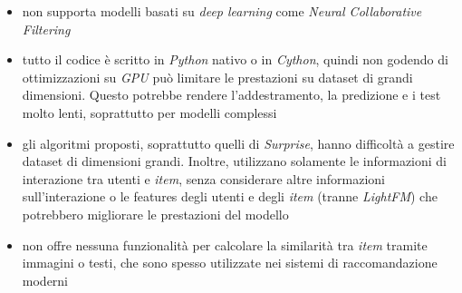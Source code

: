 \begin{itemize}
    \item non supporta modelli basati su \textit{deep learning} come \textit{Neural Collaborative Filtering}
    \item tutto il codice è scritto in \textit{Python} nativo o in \textit{Cython}, quindi non godendo di ottimizzazioni su \textit{GPU} può limitare le prestazioni su dataset di grandi dimensioni. Questo potrebbe rendere l'addestramento, la predizione e i test molto lenti, soprattutto per modelli complessi
    \item gli algoritmi proposti, soprattutto quelli di \textit{Surprise}, hanno difficoltà a gestire dataset di dimensioni grandi. Inoltre, utilizzano solamente le informazioni di interazione tra utenti e \textit{item}, senza considerare altre informazioni sull'interazione o le features degli utenti e degli \textit{item} (tranne \textit{LightFM}) che potrebbero migliorare le prestazioni del modello
    \item non offre nessuna funzionalità per calcolare la similarità tra \textit{item} tramite immagini o testi, che sono spesso utilizzate nei sistemi di raccomandazione moderni    
\end{itemize}



